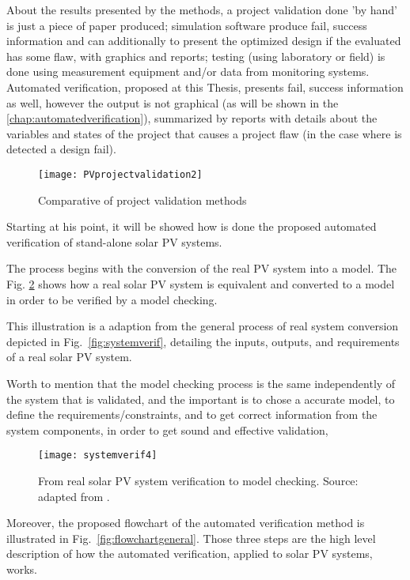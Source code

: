 About the results presented by the methods, a project validation done 'by hand' is just a piece of paper produced; simulation software produce fail, success information and can additionally to present the optimized design if the evaluated has some flaw, with graphics and reports; testing (using laboratory or field) is done using measurement equipment and/or data from monitoring systems. Automated verification, proposed at this Thesis, presents fail, success information as well, however the output is not graphical (as will be shown in the  \autoref{chap:automatedverification}), summarized by reports with details about the variables and states of the project that causes a project flaw (in the case where is detected a design fail).

\begin{figure}[h]
\texttt{[image: PVprojectvalidation2]}
\centering
\caption{Comparative of project validation methods}
\label{fig:validation}
\end{figure}

Starting at his point, it will be showed how is done the proposed automated verification of stand-alone solar PV systems. 

The process begins with the conversion of the real PV system into a model. The Fig. \ref{fig:systemverif4} shows how a real solar PV system is equivalent and converted to a model in order to be verified by a model checking. 

This illustration is a adaption from the general process of real system conversion depicted in Fig.~\ref{fig:systemverif}, detailing the inputs, outputs, and requirements of a real solar PV system. 

Worth to mention that the model checking process is the same independently of the system that is validated, and the important is to chose a accurate model, to define the requirements/constraints, and to get correct information from the system components, in order to get sound and effective validation,

\begin{figure}[h]
\texttt{[image: systemverif4]}
\centering
\caption{From real solar PV system verification to model checking. Source: adapted from \cite{Clarke2008}.}
\label{fig:systemverif4}
\end{figure}

Moreover, the proposed flowchart of the automated verification method is illustrated in Fig.~\ref{fig:flowchartgeneral}. Those three steps are the high level description of how the automated verification, applied to solar PV systems, works.

